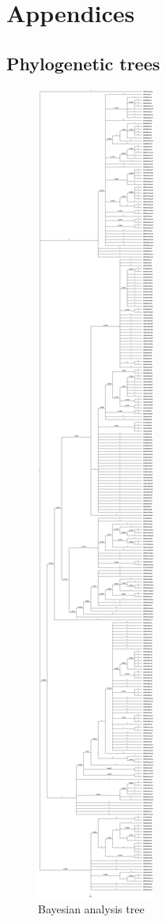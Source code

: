 \part{Appendices}
\label{appendices}

\chapter{Phylogenetic trees}
\label{phylogenetictrees}

\begin{figure}[htbp]
\centering
\includegraphics[keepaspectratio,width=\textwidth,height=0.75\textheight]{images/mcmc.jpg}
\caption{Bayesian analysis tree}
\end{figure}

